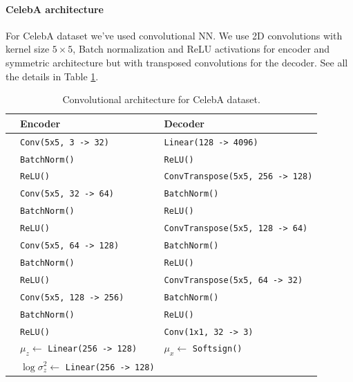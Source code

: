 \paragraph{CelebA architecture} For CelebA dataset we've used convolutional NN. We use 2D convolutions with kernel size $5\times 5$, Batch normalization and ReLU activations for encoder and symmetric architecture but with transposed convolutions for the decoder. See all the details in Table \ref{tab:celeba_arc}.

\begin{table}[t]
\begin{center}
\caption{Convolutional architecture for CelebA dataset.}
\label{tab:celeba_arc}
\begin{tabular}{@{}lll@{}}
\toprule
                   & Encoder & Decoder  \\  \midrule
& \texttt{Conv(5x5, 3 -> 32)} & \texttt{Linear(128 -> 4096)} \\
& \texttt{BatchNorm()} &\texttt{ReLU()} \\
& \texttt{ReLU()} &\texttt{ConvTranspose(5x5, 256 -> 128)} \\
& \texttt{Conv(5x5, 32 -> 64)} & \texttt{BatchNorm()}\\
& \texttt{BatchNorm()} & \texttt{ReLU()}\\
& \texttt{ReLU()} & \texttt{ConvTranspose(5x5, 128 -> 64)}\\
& \texttt{Conv(5x5, 64 -> 128)} &\texttt{BatchNorm()} \\
& \texttt{BatchNorm()} & \texttt{ReLU()}\\
& \texttt{ReLU()} & \texttt{ConvTranspose(5x5, 64 -> 32)}\\
& \texttt{Conv(5x5, 128 -> 256)} & \texttt{BatchNorm()}\\
& \texttt{BatchNorm()} & \texttt{ReLU()}\\
& \texttt{ReLU()} & \texttt{Conv(1x1, 32 -> 3)}\\
& $\mu_z \leftarrow$  \texttt{Linear(256 -> 128)} & $\mu_x \leftarrow$  \texttt{Softsign()}  \\
& $\log \sigma^2_z \leftarrow$ \texttt{Linear(256 -> 128)}&\\ 
\bottomrule
\end{tabular}
\end{center}
\end{table}

